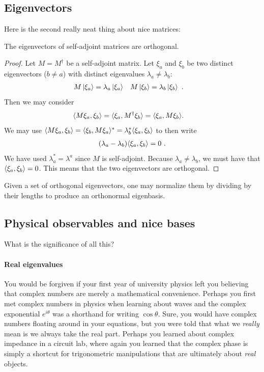 \documentclass[12pt, oneside]{report}    %
\begin{document}
\subsection{Eigenvectors}

Here is the second really neat thing about nice matrices:
\begin{theorem}
The eigenvectors of self-adjoint matrices are orthogonal.
\end{theorem}
\begin{proof}
Let $M=M^\dag$ be a self-adjoint matrix. Let $\xi_a$ and $\xi_b$ be two distinct eigenvectors ($b\neq a$) with distinct eigenvalues $\lambda_a \neq \lambda_b$:
\begin{align}
    M\left|\xi_a\right\rangle &= \lambda_a\left|\xi_a\right\rangle 
    &
    M\left|\xi_b\right\rangle &= \lambda_b\left|\xi_b\right\rangle 
    \ .
\end{align}
Then we may consider
\begin{align}
    \langle M \xi_a, \xi_b \rangle 
    &= 
    \langle \xi_a, M^\dag \xi_b \rangle 
    =
    \langle \xi_a, M \xi_b \rangle
    .
\end{align}
We may use $\langle M \xi_a, \xi_b \rangle = \langle \xi_b, M \xi_a \rangle^* = \lambda_b^*\langle \xi_a, \xi_b \rangle$ to then write
\begin{align}
    (\lambda_a - \lambda_b)\langle \xi_a,\xi_b\rangle = 0 \ .
\end{align}
We have used $\lambda_a^* = \lambda^a$ since $M$ is self-adjoint. Because $\lambda_a\neq \lambda_b$, we must have that $\langle \xi_a, \xi_b\rangle = 0$. This means that the two eigenvectors are orthogonal. 
\end{proof}
Given a set of orthogonal eigenvectors, one may normalize them by dividing by their lengths to produce an orthonormal eigenbasis. 

\subsection{Physical observables and nice bases}

What is the significance of all this? 

\paragraph{Real eigenvalues}
You would be forgiven if your first year of university physics left you believing that complex numbers are merely a mathematical convenience. Perhaps you first met complex numbers in physics when learning about waves and the complex exponential $e^{i\theta}$ was a shorthand for writing $\cos\theta$. Sure, you would have complex numbers floating around in your equations, but you were told that what we \emph{really} mean is we always take the real part. Perhaps you learned about complex impedance in a circuit lab, where again you learned that the complex phase is simply a shortcut for trigonometric manipulations that are ultimately about \emph{real} objects. 
\end{document}
